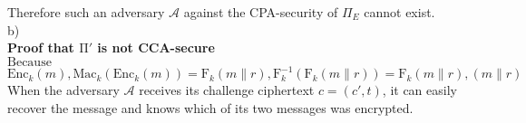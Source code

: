  Therefore such an adversary \(\mathcal{A}\) against the CPA-security of \(\Pi_{E}\) cannot exist.\\
\vskip 1cm
\noindent b)\\
\noindent\textbf{Proof that $\mathrm{\Pi'}$ is not CCA-secure}\\

$\mathrm{Because}$ $\mathrm{Enc}_{k}(m), \mathrm{Mac}_{k}(\mathrm{Enc}_{k}(m)) = \mathrm{F}_{k}(m\parallel r), \mathrm{F}_{k}^{-1}(\mathrm{F}_{k}(m\parallel r)) = \mathrm{F}_{k}(m\parallel r), (m\parallel r)$\\

When the adversary $\mathcal{A}$ receives its challenge ciphertext $c = (c', t)$, it can easily recover the message and knows which of its two messages was encrypted.



